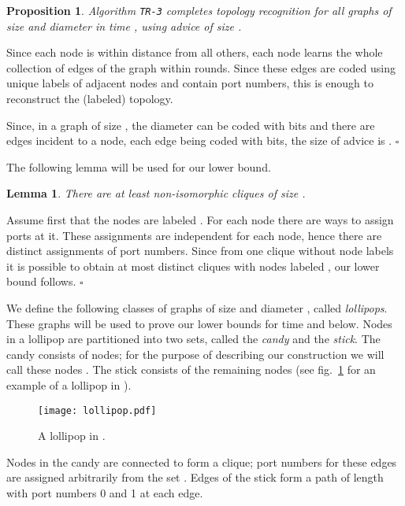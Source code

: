 \documentclass{article}
\newcommand*{\qed}{\hfill\ensuremath{\square}}
\newtheorem{lemma}{Lemma}[section]
\newtheorem{proposition}{Proposition}[section]
\newenvironment{proof}{\noindent{\bf Proof:}}{\qed}
\begin{document}
\begin{proposition}\label{ubTimeD}
Algorithm {\tt TR-3} completes topology recognition for all graphs of size  and diameter  in time , using advice of size .
\end{proposition}
\begin{proof}
Since each node is within distance  from all others, each node learns the whole collection of edges of the graph within  rounds.
Since these edges are coded using unique labels of adjacent nodes and contain port numbers, this is enough to reconstruct the (labeled) topology.

Since, in a graph of size , the diameter  can be coded with  bits and there are  edges incident to a node, each edge being coded with  bits, the size of advice is .
\end{proof}




The following lemma will be used for our lower bound.

\begin{lemma}\label{cliques}
There are at least { non-isomorphic cliques of size .}\end{lemma}
\begin{proof}
{Assume first that the nodes are labeled . For each node  there are  ways to assign ports at it. These assignments are independent for each node, hence there are  distinct assignments of port numbers.
Since from one clique without node labels it is possible to obtain at most  distinct cliques with nodes labeled , our lower bound follows.}
\end{proof}

We define the following classes  of graphs of size  and diameter , called {\it lollipops}.
These graphs will be used to prove our lower bounds for time  and below.
Nodes in a  lollipop  are partitioned into two sets, called the {\em candy} and the {\em stick}.
The candy consists of  nodes; for the purpose of describing our construction we will call these nodes . The stick consists of the remaining  nodes {(see fig.~\ref{fig.lollipop} for an example of a lollipop in )}. 

\begin{figure}
\centering
\texttt{[image: lollipop.pdf]}
\caption{\label{fig.lollipop} A lollipop in .}
\end{figure}

Nodes in the candy are connected to form a clique; port numbers for these edges are assigned arbitrarily from the set . 
Edges of the stick form a path of length  with port numbers 0 and 1 at each edge. 
\end{document}

